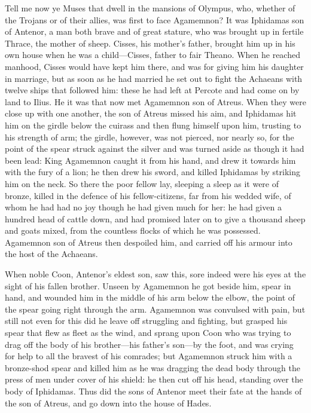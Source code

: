 Tell me now ye Muses that dwell in the mansions of Olympus, who, whether
of the Trojans or of their allies, was first to face Agamemnon? It was
Iphidamas son of Antenor, a man both brave and of great stature, who was
brought up in fertile Thrace, the mother of sheep. Cisses, his mother’s
father, brought him up in his own house when he was a child—Cisses,
father to fair Theano. When he reached manhood, Cisses would have kept him
there, and was for giving him his daughter in marriage, but as soon as he
had married he set out to fight the Achaeans with twelve ships that
followed him: these he had left at Percote and had come on by land to
Ilius. He it was that now met Agamemnon son of Atreus. When they were
close up with one another, the son of Atreus missed his aim, and Iphidamas
hit him on the girdle below the cuirass and then flung himself upon him,
trusting to his strength of arm; the girdle, however, was not pierced, nor
nearly so, for the point of the spear struck against the silver and was
turned aside as though it had been lead: King Agamemnon caught it from his
hand, and drew it towards him with the fury of a lion; he then drew his
sword, and killed Iphidamas by striking him on the neck. So there the poor
fellow lay, sleeping a sleep as it were of bronze, killed in the defence
of his fellow-citizens, far from his wedded wife, of whom he had had no
joy though he had given much for her: he had given a hundred head of
cattle down, and had promised later on to give a thousand sheep and goats
mixed, from the countless flocks of which he was possessed. Agamemnon son
of Atreus then despoiled him, and carried off his armour into the host of
the Achaeans.

When noble Coon, Antenor’s eldest son, saw this, sore indeed were his eyes
at the sight of his fallen brother. Unseen by Agamemnon he got beside him,
spear in hand, and wounded him in the middle of his arm below the elbow,
the point of the spear going right through the arm. Agamemnon was
convulsed with pain, but still not even for this did he leave off
struggling and fighting, but grasped his spear that flew as fleet as the
wind, and sprang upon Coon who was trying to drag off the body of his
brother—his father’s son—by the foot, and was crying for help
to all the bravest of his comrades; but Agamemnon struck him with a
bronze-shod spear and killed him as he was dragging the dead body through
the press of men under cover of his shield: he then cut off his head,
standing over the body of Iphidamas. Thus did the sons of Antenor meet
their fate at the hands of the son of Atreus, and go down into the house
of Hades.

